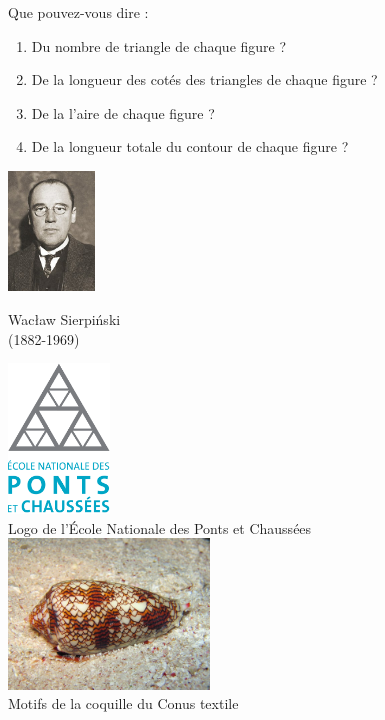 \documentclass[a4paper,11pt,exos]{nsi} %
\begin{document}
Que pouvez-vous dire :
\begin{enumerate}[label=\textbullet]
    \item Du nombre de triangle de chaque figure ?
    \item De la longueur des cotés des triangles de chaque figure ?
    \item De la l'aire de chaque figure ?
    \item De la longueur totale du contour de chaque figure ?
\end{enumerate}

{\includegraphics[width=2.3cm]{Wacław_Sierpiński.jpg}
\begin{center}
    \tiny{Wacław Sierpiński\\ (1882-1969)}
\end{center}}

\begin{multicols}{2}
    \begin{center}
        
        \includegraphics[height=4cm]{Logo-ENPC.svg.png}\\[.5em]
        Logo de l'École Nationale des Ponts et Chaussées\\
        \vfill\null
        \columnbreak
        \includegraphics[height=4cm]{Textile_cone.jpg}\\[.5em]
        Motifs de la coquille du Conus textile
    \end{center}
\end{multicols}
\end{document}
